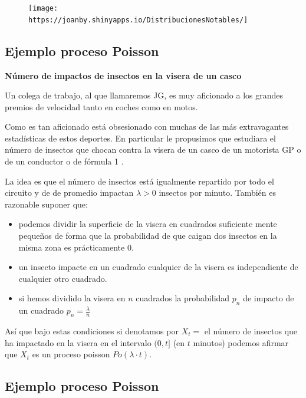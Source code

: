 \documentclass[]{book}
\providecommand{\tightlist}{%
  \setlength{\itemsep}{0pt}\setlength{\parskip}{0pt}}
\begin{document}
\begin{figure}
\centering
\texttt{[image: https://joanby.shinyapps.io/DistribucionesNotables/]}
\caption{\href{Images/noshinyImages/interactivos_proceso_poisson1.png}{}}
\end{figure}

\hypertarget{ejemplo-proceso-poisson}{%
\subsection{Ejemplo proceso Poisson}\label{ejemplo-proceso-poisson}}

\textbf{Número de impactos de insectos en la visera de un casco}

Un colega de trabajo, al que llamaremos JG, es muy aficionado a los grandes premios de velocidad tanto en coches como en motos.

Como es tan aficionado está obsesionado con muchas de las más extravagantes estadísticas de estos deportes.
En particular le propusimos que estudiara el número de insectos que chocan contra la visera de un casco de un motorista GP o de un conductor o de fórmula 1 .

La idea es que el número de insectos está igualmente repartido por todo el circuito y de de promedio impactan \(\lambda>0\) insectos por minuto. También es razonable suponer que:

\begin{itemize}
\tightlist
\item
  podemos dividir la superficie de la visera en cuadrados suficiente mente pequeños de forma que la probabilidad de que caigan dos insectos en la misma zona es prácticamente 0.
\item
  un insecto impacte en un cuadrado cualquier de la visera es independiente de cualquier otro cuadrado.
\item
  si hemos dividido la visera en \(n\) cuadrados la probabilidad \(p_n\) de impacto de un cuadrado \(p_n=\frac{\lambda}{n}\)
\end{itemize}

Así que bajo estas condiciones si denotamos por \(X_t=\) el número de insectos que ha impactado en la visera en el intervalo \((0,t]\) (en \(t\) minutos) podemos afirmar que \(X_t\) es un proceso poisson \(Po(\lambda\cdot t)\).

\hypertarget{ejemplo-proceso-poisson-1}{%
\subsection{Ejemplo proceso Poisson}\label{ejemplo-proceso-poisson-1}}
\end{document}
